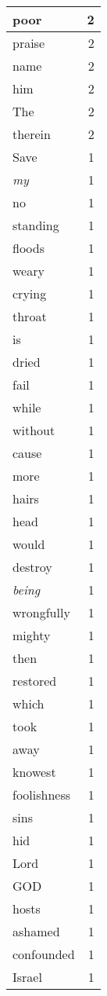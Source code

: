 \begin{center}
\begin{longtable}{l|r}
poor & 2\\ \hline 
praise & 2\\ \hline 
name & 2\\ \hline 
him & 2\\ \hline 
The & 2\\ \hline 
therein & 2\\ \hline 
Save & 1\\ \hline 
\emph{my} & 1\\ \hline 
no & 1\\ \hline 
standing & 1\\ \hline 
floods & 1\\ \hline 
weary & 1\\ \hline 
crying & 1\\ \hline 
throat & 1\\ \hline 
is & 1\\ \hline 
dried & 1\\ \hline 
fail & 1\\ \hline 
while & 1\\ \hline 
without & 1\\ \hline 
cause & 1\\ \hline 
more & 1\\ \hline 
hairs & 1\\ \hline 
head & 1\\ \hline 
would & 1\\ \hline 
destroy & 1\\ \hline 
\emph{being} & 1\\ \hline 
wrongfully & 1\\ \hline 
mighty & 1\\ \hline 
then & 1\\ \hline 
restored & 1\\ \hline 
which & 1\\ \hline 
took & 1\\ \hline 
away & 1\\ \hline 
knowest & 1\\ \hline 
foolishness & 1\\ \hline 
sins & 1\\ \hline 
hid & 1\\ \hline 
Lord & 1\\ \hline 
GOD & 1\\ \hline 
hosts & 1\\ \hline 
ashamed & 1\\ \hline 
confounded & 1\\ \hline 
Israel & 1\\ \hline 

\end{longtable}
\end{center}
